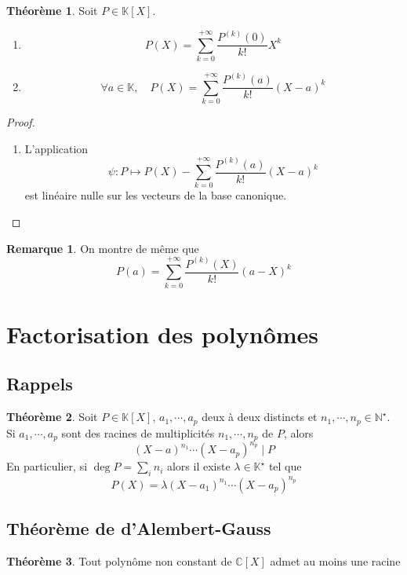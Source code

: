 \documentclass{article}
\theoremstyle{definition}
\newtheorem*{thm}{Théorème}
\newtheorem*{rem}{Remarque}
\begin{document}
\begin{thm}
    Soit $P\in\mathbb K[X]$.
    \begin{enumerate}
        \item \[
                P(X)=\sum_{k=0}^{+\infty} \frac{P^{(k)}(0)}{k!}X^k
            \]
        \item \[
                \forall a\in\mathbb K, \quad P(X)=\sum_{k=0}^{+\infty}\frac{P^{(k)}(a)}{k!}(X-a)^k
            \]
    \end{enumerate}
\end{thm}
\begin{proof} ~
    \begin{enumerate}
        \item L'application \[
                \psi: P\longmapsto P(X)-\sum_{k=0}^{+\infty}\frac{P^{(k)}(a)}{k!}(X-a)^k
            \]
            est linéaire nulle sur les vecteurs de la base canonique.
    \end{enumerate}
\end{proof}

\begin{rem}
    On montre de même que \[
        P(a)=\sum_{k=0}^{+\infty}\frac{P^{(k)}(X)}{k!}(a-X)^k
    \]
\end{rem}

\section{Factorisation des polynômes}

\subsection{Rappels}

\begin{thm}
    Soit $P\in\mathbb K[X]$, $a_1, \cdots, a_p$ deux à deux distincts et $n_1, \cdots, n_p\in\mathbb N^\star$. Si $a_1, \cdots, a_p$ sont des racines de multiplicités $n_1, \cdots, n_p$ de $P$, alors \[
        (X-a)^{n_1}\cdots (X-a_p)^{n_p}\;|\;P
    \]
    En particulier, si $\deg P=\sum_i n_i$ alors il existe $\lambda\in\mathbb K^\star$ tel que \[
        P(X)=\lambda(X-a_1)^{n_1}\cdots (X-a_p)^{n_p}
    \]
\end{thm}

\subsection{Théorème de d'Alembert-Gauss}

\begin{thm}
    Tout polynôme non constant de $\mathbb C[X]$ admet au moins une racine
\end{thm}
\end{document}
